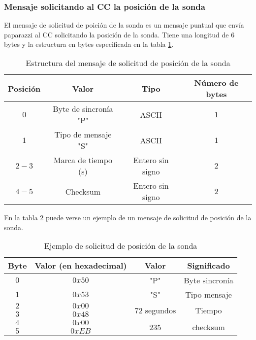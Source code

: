 \subsubsection{Mensaje solicitando al CC la posición de la sonda}

El mensaje de solicitud de poición de la sonda es un mensaje puntual que envía paparazzi al CC solicitando la posición de la sonda. Tiene una longitud de $6$ bytes y la estructura en bytes especificada en la tabla \ref{tab6}.

\begin{table}[h]
	\centering
	\caption{Estructura del mensaje de solicitud de posición de la sonda}
	\begin{tabular}{|c|c|c|c|}\hline 
		\textbf{Posición}	& \textbf{Valor} & \textbf{Tipo} &\textbf{Número de bytes} \\ \hline \hline 
		$0$		& Byte de sincronía "P"				& ASCII	 			&	$1$ \\  \hline
		$1$		& Tipo de mensaje "S"				& ASCII	 			&	$1$ \\  \hline
		$2-3$	& Marca de tiempo (s)				& Entero sin signo	&   $2$ \\  \hline
		$4-5$	& Checksum 							& Entero sin signo	&   $2$ \\  \hline
	\end{tabular}
	\label{tab6}
\end{table}

En la tabla \ref{tab7} puede verse un ejemplo de un mensaje de solicitud de posición de la sonda.

\begin{table}[h]
	\centering
	\caption{Ejemplo de solicitud de posición de la sonda}
	\begin{tabular}{|c|c|c|c|}\hline
		\textbf{Byte} 	&	\textbf{Valor (en hexadecimal)}	&\textbf{Valor}	&\textbf{Significado} \\ \hline \hline
		$0$ 			&  $0x50$			& "P"	& Byte sincronía	\\ \hline
		$1$				&  $0x53$			& "S"	& Tipo mensaje		\\ \hline
		$2$				&  $0x00$			& \multirow{2}{*}{$72$ segundos} & \multirow{2}{*}{Tiempo} \\
		$3$				&  $0x48$			&  & \\ \hline	
		$4$				&  $0x00$			&  \multirow{2}{*}{235}	& \multirow{2}{*}{checksum} \\
		$5$				&  $0xEB$			&     &     \\ \hline	
		
		
	\end{tabular}
	\label{tab7}
\end{table}

